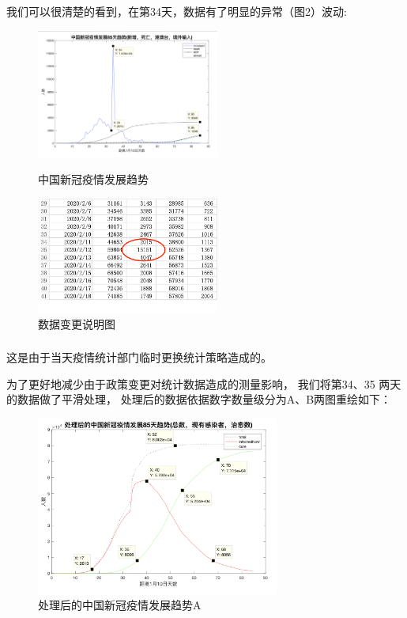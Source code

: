 \documentclass[UTF8]{ctexart}
\begin{document}
\par
我们可以很清楚的看到，在第34天，数据有了明显的异常（图2）波动:
\begin{figure}[htbp]
\centering
\begin{minipage}[t]{0.48\textwidth}
\centering
\includegraphics[width=6cm]{2.png}
\caption{中国新冠疫情发展趋势}
\end{minipage}
\begin{minipage}[t]{0.48\textwidth}
\centering
\includegraphics[width=6cm]{excel.png}
\caption{数据变更说明图}
\end{minipage}
\end{figure}
\subsubsection{}
\par 


这是由于当天疫情统计部门临时更换统计策略造成的。
\\
\par 
为了更好地减少由于政策变更对统计数据造成的测量影响，
我们将第34、35 两天的数据做了平滑处理，
处理后的数据依据数字数量级分为A、B两图重绘如下：

\begin{figure}[htbp][H]
\centering
\includegraphics[width=8cm]{3.png} 
\caption{处理后的中国新冠疫情发展趋势A}
\end{figure}
\par
\end{document}

